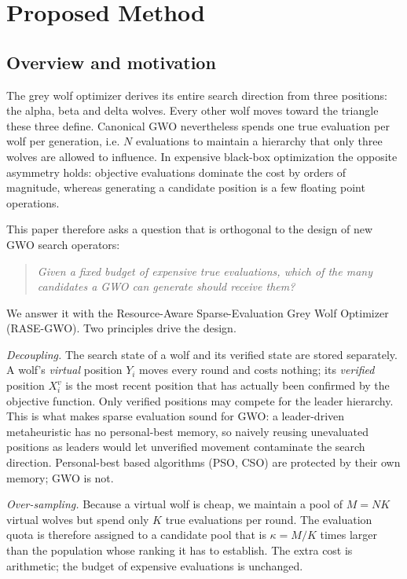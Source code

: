 \section{Proposed Method}

\subsection{Overview and motivation}

The grey wolf optimizer derives its entire search direction from three positions:
the alpha, beta and delta wolves. Every other wolf moves toward the triangle
these three define. Canonical GWO nevertheless spends one true evaluation per
wolf per generation, i.e. $N$ evaluations to maintain a hierarchy that only
three wolves are allowed to influence. In expensive black-box optimization the
opposite asymmetry holds: objective evaluations dominate the cost by orders of
magnitude, whereas generating a candidate position is a few floating point
operations.

This paper therefore asks a question that is orthogonal to the design of new
GWO search operators:

\begin{quote}
\emph{Given a fixed budget of expensive true evaluations, which of the many
candidates a GWO can generate should receive them?}
\end{quote}

We answer it with the Resource-Aware Sparse-Evaluation Grey Wolf Optimizer
(RASE-GWO). Two principles drive the design.

\emph{Decoupling.} The search state of a wolf and its verified state are stored
separately. A wolf's \emph{virtual} position $Y_i$ moves every round and costs
nothing; its \emph{verified} position $X_i^{v}$ is the most recent position that
has actually been confirmed by the objective function. Only verified positions
may compete for the leader hierarchy. This is what makes sparse evaluation
sound for GWO: a leader-driven metaheuristic has no personal-best memory, so
naively reusing unevaluated positions as leaders would let unverified movement
contaminate the search direction. Personal-best based algorithms
(PSO, CSO) are protected by their own memory; GWO is not.

\emph{Over-sampling.} Because a virtual wolf is cheap, we maintain a pool of
$M = NK$ virtual wolves but spend only $K$ true evaluations per round. The
evaluation quota is therefore assigned to a candidate pool that is
$\kappa = M/K$ times larger than the population whose ranking it has to
establish. The extra cost is arithmetic; the budget of expensive evaluations is
unchanged.

